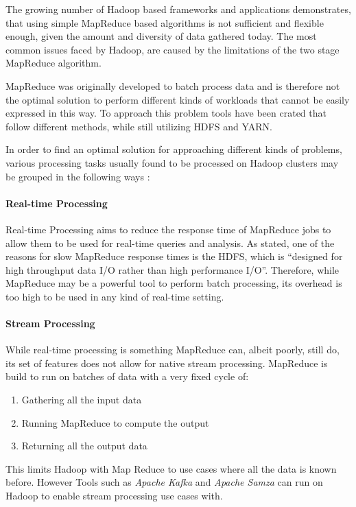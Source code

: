 The growing number of Hadoop based frameworks and applications demonstrates, that using simple MapReduce based algorithms is not sufficient and flexible enough, given the amount and diversity of data gathered today. The most common issues faced by Hadoop, are caused by the limitations of the two stage MapReduce algorithm.\autocite[][]{6903263} 

MapReduce was originally developed to batch process data and is
therefore not the optimal solution to perform different kinds of
workloads that cannot be easily expressed in this
way.\autocite{computers3040117}
To approach this problem tools have been crated that follow different methods, while still utilizing \ac{HDFS} and \ac{YARN}.

In order to find an optimal solution for approaching different kinds of problems, various processing tasks usually found to be processed on Hadoop clusters may be grouped in the following ways \autocite{computers3040117}:

\paragraph{Real-time Processing}
Real-time Processing aims to reduce the response time of MapReduce jobs to allow them to be used for real-time queries and analysis. As \autocite{computers3040117} stated, one of the reasons for slow MapReduce response times is the \ac{HDFS}, which is \enquote{designed for high throughput data I/O rather than high performance I/O}.
Therefore, while MapReduce may be a powerful tool to perform batch processing, its overhead is too high to be used in any kind of real-time setting.\autocite{computers3040117}

\paragraph{Stream Processing}
While real-time processing is something MapReduce can, albeit poorly, still do, its set of features does not allow for native stream processing. MapReduce is build to run on batches of data with a very fixed cycle of:
\begin{enumerate}
    \item Gathering all the input data
    \item Running MapReduce to compute the output
    \item Returning all the output data
\end{enumerate}
This limits Hadoop with Map Reduce to use cases where all the data is known before.
However Tools such as \emph{Apache Kafka} and \emph{Apache Samza} can run on Hadoop to enable stream processing use cases with.

